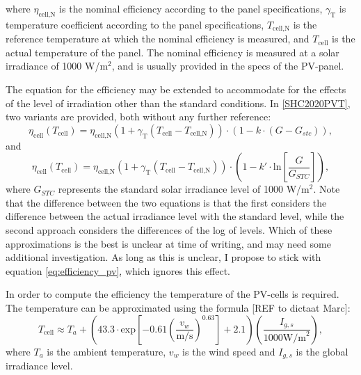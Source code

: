 where $\eta_{\text{cell,N}} $ is the nominal efficiency according to the panel specifications, $\gamma_{\text{T}}$ is temperature coefficient according to the panel specifications, $T_{\text{cell,N}}$ is the reference temperature at which the nominal efficiency is measured, and $T_{\text{cell}}$ is the actual temperature of the panel. The nominal efficiency is measured at a solar irradiance of 1000 W/$\text{m}^2$, and is usually provided in the specs of the PV-panel. 

The equation for the efficiency may be extended to accommodate for the effects of the level of irradiation other than the standard conditions. In \ref{SHC2020PVT}, two variants are provided, both without any further reference:
\begin{equation}
  \eta_{\text{cell}}(T_{\text{cell}}) = \eta_{\text{cell,N}} \left( 1 + \gamma_{\text{T}}\left(T_{\text{cell}} - T_{\text{cell,N}} \right) \right)\cdot (1-k\cdot(G - G_{stc})),
\end{equation}
and
\begin{equation}
  \eta_{\text{cell}}(T_{\text{cell}}) = \eta_{\text{cell,N}} \left( 1 + \gamma_{\text{T}}\left(T_{\text{cell}} - T_{\text{cell,N}} \right) \right)\cdot \left(1-k'\cdot \text{ln}\left[\frac{G}{G_{STC}}\right] \right),
\end{equation}
where $G_{STC}$ represents the standard solar irradiance level of 1000 W/$\text{m}^2$. Note that the difference between the two equations is that the first considers the difference between the actual irradiance level with the standard level, while the second approach considers the differences of the log of levels. Which of these approximations is the best is unclear at time of writing, and may need some additional investigation. As long as this is unclear, I propose to stick with equation \ref{eq:efficiency_pv}, which ignores this effect. 


In order to compute the efficiency the temperature of the PV-cells is required. The temperature can be approximated using the formula [REF to dictaat Marc]:
\begin{equation}
	T_{\text{cell}} \approx T_a + \left( 43.3 \cdot \text{exp} \left[-0.61 \left(\frac{v_w}{\text{m/s}} \right)^{0.63} \right] + 2.1 \right)\left(\frac{I_{g,s}}{1000\text{W/m}^2} \right), 
\label{eq:temp_panel}
\end{equation}
where $T_a$ is the ambient temperature, $v_w$ is the wind speed and $I_{g,s}$ is the global irradiance level. 



